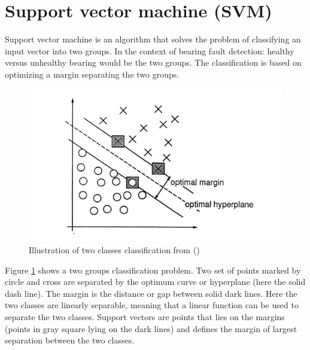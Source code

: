 \documentclass[../Main/thesis.tex]{subfiles}
\begin{document}
\section{Support vector machine (SVM)}
\label{sec:svm}
Support vector machine is an algorithm  that solves the problem of classifying an input vector into two groups. In the context of bearing fault detection: healthy versus unhealthy bearing would be the two groups.
The classification is based on optimizing a margin separating the two groups. 
\begin{figure}[H] %
   \centering
   \includegraphics[width=5in]{../fig/svm2d.png} 
   \caption{Illustration of two classes classification from (\cite{vapnik1995})}
   \label{fig:svm2d}
\end{figure}
\justify
Figure \ref{fig:svm2d} shows a two groups classification problem. Two set of points marked by circle and cross are separated by the optimum curve or hyperplane (here the solid dash line). The margin is the distance or gap between solid dark lines. Here the two classes are linearly separable, meaning that a linear function can be used to separate the two classes. Support vectors are points that lies on the margins (points in gray square lying on the dark lines) and defines the margin of largest separation between the two classes.
\justify
\end{document}
